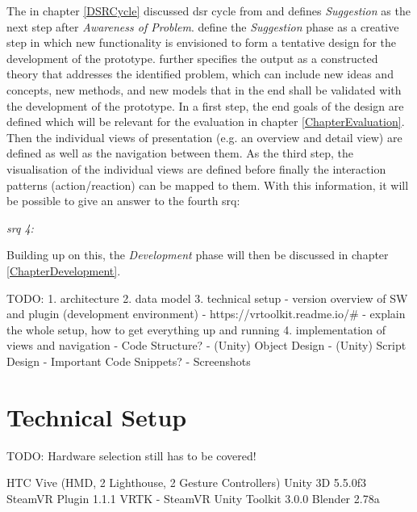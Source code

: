 The in chapter \ref{DSRCycle} discussed \gls{dsr} cycle from \cite{Vaishnavi2008} and \cite{Hevner2010} defines \textit{Suggestion} as the next step after \textit{Awareness of Problem}. \cite{Vaishnavi2008} define the \textit{Suggestion} phase as a creative step in which new functionality is envisioned to form a tentative design for the development of the prototype. \cite{Vaishnavi2008} further specifies the output as a constructed theory that addresses the identified problem, which can include new ideas and concepts, new methods, and new models that in the end shall be validated with the development of the prototype. In a first step, the end goals of the design are defined which will be relevant for the evaluation in chapter \ref{ChapterEvaluation}. Then the individual views of presentation (e.g. an overview and detail view) are defined as well as the navigation between them. As the third step, the visualisation of the individual views are defined before finally the interaction patterns (action/reaction) can be mapped to them. With this information, it will be possible to give an answer to the fourth \gls{srq}:
\begin{framed}
	\textit{\gls{srq} 4: \srqfourtext}
\end{framed}
Building up on this, the \textit{Development} phase will then be discussed in chapter \ref{ChapterDevelopment}.



TODO:
1. architecture
2. data model
3. technical setup
- version overview of SW and plugin (development environment)
- https://vrtoolkit.readme.io/#
- explain the whole setup, how to get everything up and running
4. implementation of views and navigation
- Code Structure?
- (Unity) Object Design
- (Unity) Script Design
- Important Code Snippets?
- Screenshots






\section{Technical Setup}

TODO: Hardware selection still has to be covered!

HTC Vive (HMD, 2 Lighthouse, 2 Gesture Controllers)
Unity 3D 5.5.0f3		\cite{Unity2016}
SteamVR Plugin 1.1.1		\cite{Valve2016a}
VRTK - SteamVR Unity Toolkit 3.0.0			\cite{Sysdia2017}
Blender 2.78a		\cite{Blender2016}

